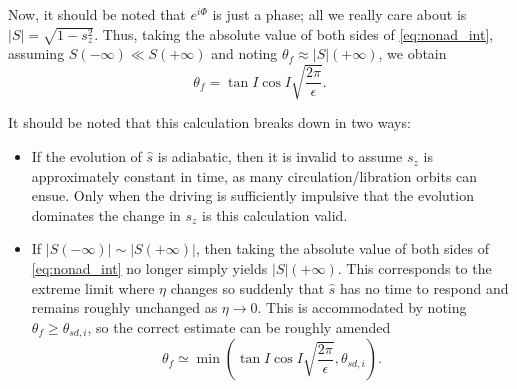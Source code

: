 \documentclass[
        fleqn,
        usenatbib,
    ]{mnras}
\newcommand*{\abs}[1]{\left|#1\right|}
\newcommand*{\p}[1]{\left(#1\right)}
\begin{document}
Now, it should be noted that $e^{i\Phi}$ is just a phase; all we really care
about is $\abs{S} = \sqrt{1 - s_z^2}$. Thus, taking the absolute value of both
sides of \autoref{eq:nonad_int}, assuming $S\p{-\infty} \ll S\p{+\infty}$ and
noting $\theta_f \approx \abs{S}(+\infty)$, we obtain
\begin{equation}
    \theta_f = \tan I\cos I\sqrt{\frac{2\pi}{\epsilon}}.\label{eq:nonad_dong}
\end{equation}

It should be noted that this calculation breaks down in two ways:
\begin{itemize}
    \item If the evolution of $\hat{s}$ is adiabatic, then it is invalid to
        assume $s_z$ is approximately constant in time, as many
        circulation/libration orbits can ensue. Only when the driving is
        sufficiently impulsive that the evolution dominates the change in $s_z$
        is this calculation valid.

    \item If $\abs{S\p{-\infty}} \sim \abs{S\p{+\infty}}$, then taking the
        absolute value of both sides of \autoref{eq:nonad_int} no longer simply
        yields $\abs{S}\p{+\infty}$. This corresponds to the extreme limit
        where $\eta$ changes so suddenly that $\hat{s}$ has no time to respond
        and remains roughly unchanged as $\eta \to 0$. This is accommodated by
        noting $\theta_f \geq \theta_{sd, i}$, so the correct estimate can be
        roughly amended
        \begin{equation}
            \theta_f \simeq \min\p{\tan I\cos I\sqrt{\frac{2\pi}{\epsilon}},
                \theta_{sd, i}}.
        \end{equation}
\end{itemize}

\label{lastpage} %
\end{document}
